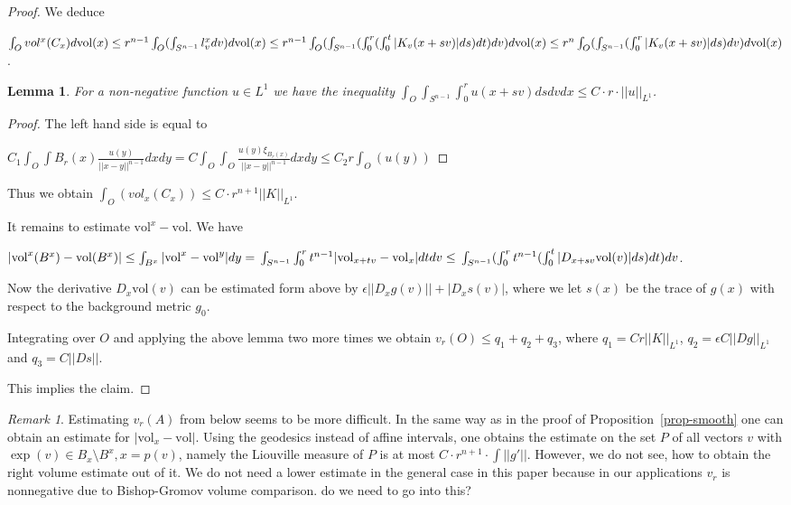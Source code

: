 \documentclass[12pt,leqno]{amsart}
\numberwithin{equation}{section}
\newtheorem{lem}[thm]{Lemma}
\theoremstyle{definition}
\theoremstyle{remark}
\newtheorem{rem}[thm]{Remark}
\newcommand{\vol}{\mathrm{vol}}
\begin{document}
\begin{proof}
    We deduce

    $\int _O vol ^x (C_x) d\vol (x) \leq r^{n-1} \int _O (\int _{S^{n-1}} l_v ^x dv) d\vol (x) \leq \\
    r^{n-1} \int _O (\int _{S^{n-1}} (\int _0 ^r (\int _0 ^t |K_v (x+sv)| ds)dt)dv)d\vol (x) \leq \\
    r^n \int _O (\int _{S^{n-1}} (\int _0 ^r |K_v (x+sv)| ds) dv)d\vol (x)$.


    \begin{lem}
    For a non-negative function $u\in L^1$ we have the inequality
    $\int _O \int _{S^{n-1}} \int _0^r u(x+sv) ds dv dx \leq C \cdot r \cdot ||u|| _{L^1}$.
    \end{lem}


     \begin{proof}
     The left hand side is equal to

     $C_1 \int _O \int B_r (x) \frac {u(y)}  {||x-y|| ^{n-1}} dx dy = C \int _O \int _O \frac {u(y) \xi _{B_r (x)}}
     {||x-y|| ^{n-1}} dx dy \leq C_2 r  \int _O (u(y))$
     \end{proof}


      Thus we obtain $\int _O (vol _x (C_x)) \leq C \cdot r^{n+1} ||K|| _{L^1}$.


      It remains to estimate $\vol ^x - \vol$. We have

      $|\vol ^x (B^x) -\vol (B^x)| \leq \int _ {B^x} |\vol ^x -\vol ^y| dy = \\
      \int _{S^{n-1}} \int _0 ^r  t^{n-1} | \vol _{x+tv} - \vol _x| dt dv \leq  \\
       \int _{ S^{n-1}} (\int _0 ^r t^{n-1} (\int _0 ^t  |D_{x+sv} \vol (v)| ds) dt) dv$.

      Now the derivative $D_x \vol (v)$ can be estimated form above by $\epsilon ||D_xg (v)|| + | D_x s (v)|$,
      where we let $s(x)$ be the trace of $g(x)$ with respect to the background metric $g_0$.

      Integrating over $O$ and applying the above lemma two more times we obtain
      $v_r (O) \leq q_1 +q_2 +q_3$, where
      $q_1 = C r ||K|| _{L^1}$, $q_2 = \epsilon C || Dg|| _{L^1} $ and $q_3 = C ||Ds||$.

      This implies the claim.
    \end{proof}


\begin{rem}
Estimating  $v_r (A)$ from below seems to be more difficult. In the same way as in the proof of Proposition~\ref{prop-smooth} one  can obtain an estimate for $|\vol _x -\vol |$.
Using the geodesics instead of affine intervals, one obtains the estimate on the set $P$ of all
vectors $v$ with $\exp (v) \in B_x \setminus B^x, x=p(v)$, namely the Liouville measure of  $P$ is
at most $C\cdot r^{n+1} \cdot \int ||g'||$.  However, we  do not see, how to obtain the right volume estimate out of it. We do not need a lower estimate  in the general case in this paper because in our applications $v_r$ is nonnegative due to Bishop-Gromov volume comparison. {\color{red} do we need to go into this?}
\end{rem}
\end{document}
